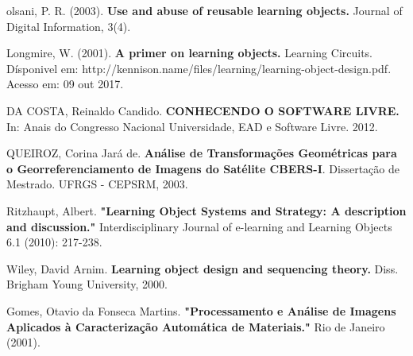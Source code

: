 \documentclass[12pt,openright,oneside,a4paper,english,french,spanish,brazil]{unifil}
\begin{document}
\begin{thebibliography}{99}
{olsani, P. R. (2003). \textbf{Use and abuse of reusable learning objects.} Journal of Digital Information, 3(4).}

{Longmire, W. (2001). \textbf{A primer on learning objects.} Learning Circuits. Dísponivel em: http://kennison.name/files/learning/learning-object-design.pdf. Acesso em: 09 out 2017.}

{DA COSTA, Reinaldo Candido. \textbf{CONHECENDO O SOFTWARE LIVRE.} In: Anais do Congresso Nacional Universidade, EAD e Software Livre. 2012.}

{QUEIROZ, Corina Jará de. \textbf{Análise de Transformações Geométricas para o Georreferenciamento de Imagens do Satélite CBERS-I}. Dissertação de Mestrado. UFRGS - CEPSRM, 2003.}

{Ritzhaupt, Albert. \textbf{"Learning Object Systems and Strategy: A description and discussion."} Interdisciplinary Journal of e-learning and Learning Objects 6.1 (2010): 217-238.}

{Wiley, David Arnim. \textbf{Learning object design and sequencing theory.} Diss. Brigham Young University, 2000.}

{Gomes, Otavio da Fonseca Martins. \textbf{"Processamento e Análise de Imagens Aplicados à Caracterização Automática de Materiais."} Rio de Janeiro (2001).}

\bibitem{}

{}

\end{thebibliography}
\end{document}
